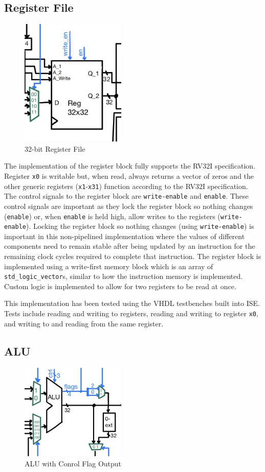 \documentclass[lettersize,journal]{IEEEtran}
\begin{document}
\subsection{Register File}
\begin{figure}[!h]
    \label{fig:regblock}
    \centering
    \includegraphics[width=5cm]{REG.jpg}
    \caption{32-bit Register File}
\end{figure}

The implementation of the register block fully supports the RV32I specification.
Register \verb|x0| is writable but, when read, always returns a vector of zeros and the other generic registers (\verb|x1|-\verb|x31|) function according to the RV32I specification.
The control signals to the register block are \verb|write-enable| and \verb|enable|.
These control signals are important as they lock the register block so nothing changes (\verb|enable|) or, when \verb|enable| is held high, allow writes to the registers (\verb|write-enable|).
Locking the register block so nothing changes (using \verb|write-enable|) is important in this non-pipelined implementation where the values of different components need to remain
 stable after being updated by an instruction for the remaining clock cycles required to complete that instruction.
The register block is implemented using a write-first memory block which is an array of \verb|std_logic_vector|s, similar to how the instruction memory is implemented.
Custom logic is implemented to allow for two registers to be read at once.

This implementation has been tested using the VHDL testbenches built into ISE.
Tests include reading and writing to registers, reading and writing to register \verb|x0|, and writing to and reading from the same register.


\subsection{ALU}
\begin{figure}[!h]
    \label{fig:alublock}
    \centering
    \includegraphics[width=5cm]{ALU.jpg}
    \caption{ALU with Conrol Flag Output}
\end{figure}
\end{document}
